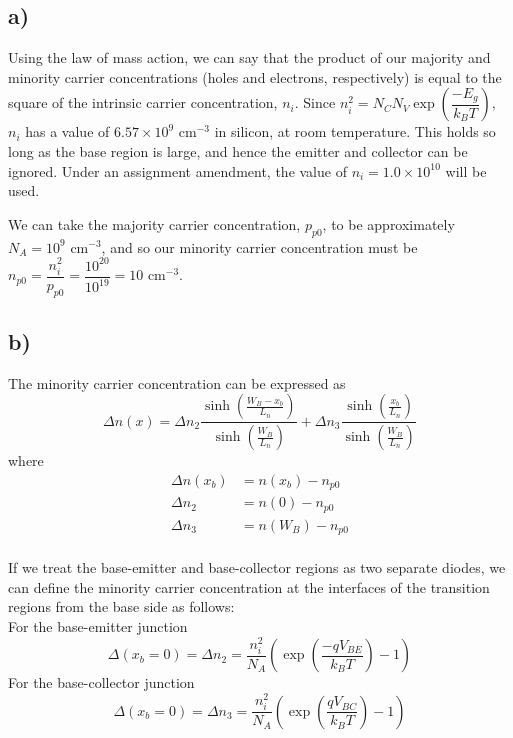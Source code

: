 \subsection*{a)}
	Using the law of mass action, we can say that the product of our majority and minority carrier concentrations (holes and electrons, respectively) is equal to the square of the intrinsic carrier concentration, $n_i$. Since $n_i^2 = N_C N_V \exp\left(\dfrac{-E_g}{k_B T}\right)$, $n_i$ has a value of $6.57 \times 10^{9} \textrm{ cm}^{-3}$ in silicon, at room temperature. This holds so long as the base region is large, and hence the emitter and collector can be ignored. Under an assignment amendment, the value of $n_i = 1.0 \times 10^{10}$ will be used.
	
	We can take the majority carrier concentration, $p_{p0}$, to be approximately $N_A = 10^9 \textrm{ cm}^{-3}$, and so our minority carrier concentration must be $n_{p0} = \dfrac{n_i^2}{p_{p0}} = \dfrac{10^{20}}{10^{19}} = 10 \textrm{ cm}^{-3}$.
\subsection*{b)}
	The minority carrier concentration can be expressed as
	$$\Delta n(x) = 
	\Delta n_2 \frac{\sinh\left(\frac{W_B - x_b}{L_n}\right)}{\sinh\left(\frac{W_B}{L_n}\right)} + 
	\Delta n_3 \frac{\sinh\left(\frac{x_b}{L_n}\right)}{\sinh\left(\frac{W_B}{L_n}\right)}
	$$	
	where
	\[
		\begin{aligned}
		\Delta n(x_b) &= n(x_b) - n_{p0} \\
		\Delta n_2  &= n(0) - n_{p0} \\
		\Delta n_3  &= n(W_B) - n_{p0} \\	
		\end{aligned}
	\]
	
	If we treat the base-emitter and base-collector regions as two separate diodes, we can define the minority carrier concentration at the interfaces of the transition regions from the base side as follows: \\
	
	\noindent For the base-emitter junction
	$$\Delta(x_b = 0) = \Delta n_2 
			= \frac{n_i^2}{N_A}
			 \left(
				\exp{\left(
					\frac{- q V_{BE}}{k_B T}				
				\right)} - 1
			\right)
	$$
	For the base-collector junction
	$$\Delta(x_b = 0) = \Delta n_3
	= \frac{n_i^2}{N_A}
	\left(
		\exp{\left(
			\dfrac{q V_{BC}}{k_B T}				
		\right)} - 1
	\right)
	$$
	
